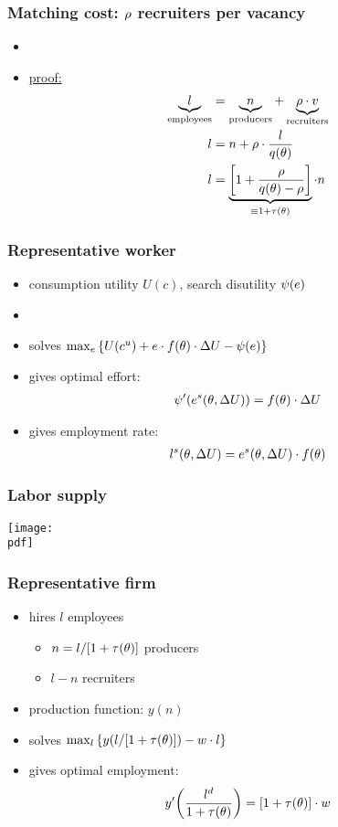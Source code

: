 \documentclass[12pt,xcolor={dvipsnames},hyperref={pdftex,pdfpagemode=UseNone,hidelinks,pdfdisplaydoctitle=true},usepdftitle=false]{beamer}
\def\pdf{xui.pdf}
\begin{document}
\begin{frame}
\frametitle{Matching cost: $\rho$ recruiters per vacancy}
\begin{itemize}
\item {}
\item \underline{proof:}
\begin{align*}
\underbrace{l}_{\text{employees}} &= \underbrace{n}_{\text{producers}}+ \underbrace{\rho\cdot v}_{\text{recruiters}}\\
l &=  n+ \rho\cdot \frac{l}{q(\theta)}\\
l &=\underbrace{\left[ 1+\frac{\rho}{q(\theta)-\rho} \right]}_{\equiv 1+\tau(\theta)} \cdot  n
\end{align*}
\end{itemize}
\end{frame}


\begin{frame}
\frametitle{Representative worker}
\begin{itemize}
\item consumption utility $U(c)$, search disutility $\psi(e)$
\item {}
\item solves $\max_{e}\bc{U(c^{u})+ e\cdot f(\t)\cdot \D U-\p(e)}$
\item {} gives optimal effort:
\begin{align*}
\psi'(e^{s}(\theta,\Delta U))=f(\theta)\cdot \Delta U
\end{align*}
\item {} gives employment rate:
\begin{align*}
l^{s}(\theta,\Delta U)=e^{s}(\theta,\Delta U)\cdot f(\theta)
\end{align*}
\end{itemize}
\end{frame}

\begin{frame}
\frametitle{Labor supply}
\texttt{[image: \\pdf]}%
\end{frame}

\begin{frame}
\frametitle{Representative firm}
\begin{itemize}
\item hires $l$ employees
\begin{itemize}
\item  $n=l/[1+\tau(\theta)]$ producers
\item $l-n$ recruiters
\end{itemize}
\item production function: $y(n)$
\item solves $\max_{l}\bc{y\of{l/[1+\tau(\t)]}- w\cdot  l}$
\item {} gives optimal employment:
\begin{align*}
y'{\left( \frac{l^{d}}{1+\tau(\theta)} \right)}= \left[ 1+\tau(\theta) \right]\cdot w
\end{align*}
\end{itemize}
\end{frame}
\end{document}
